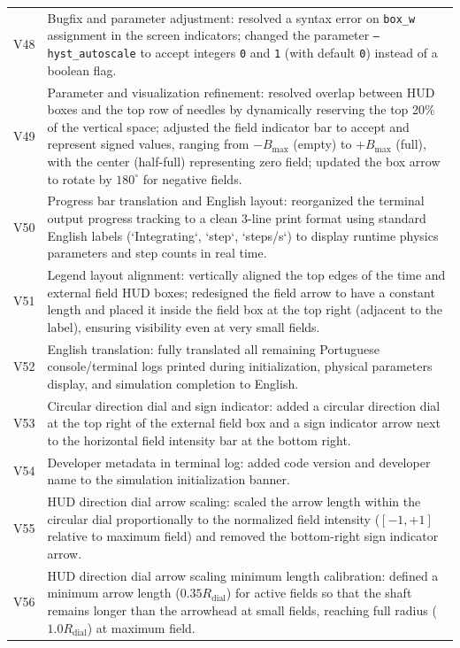 \documentclass[11pt,a4paper]{article}
\newcommand{\code}[1]{\texttt{#1}}
\begin{document}
\begin{longtable}{@{}lp{11.5cm}@{}}
V48 & Bugfix and parameter adjustment: resolved a syntax error on \code{box\_w} assignment in the screen indicators; changed the parameter \code{--hyst\_autoscale} to accept integers \code{0} and \code{1} (with default \code{0}) instead of a boolean flag. \\
V49 & Parameter and visualization refinement: resolved overlap between HUD boxes and the top row of needles by dynamically reserving the top 20\% of the vertical space; adjusted the field indicator bar to accept and represent signed values, ranging from $-B_{\max}$ (empty) to $+B_{\max}$ (full), with the center (half-full) representing zero field; updated the box arrow to rotate by $180^\circ$ for negative fields. \\
V50 & Progress bar translation and English layout: reorganized the terminal output progress tracking to a clean 3-line print format using standard English labels (`Integrating`, `step`, `steps/s`) to display runtime physics parameters and step counts in real time. \\
V51 & Legend layout alignment: vertically aligned the top edges of the time and external field HUD boxes; redesigned the field arrow to have a constant length and placed it inside the field box at the top right (adjacent to the label), ensuring visibility even at very small fields. \\
V52 & English translation: fully translated all remaining Portuguese console/terminal logs printed during initialization, physical parameters display, and simulation completion to English. \\
V53 & Circular direction dial and sign indicator: added a circular direction dial at the top right of the external field box and a sign indicator arrow next to the horizontal field intensity bar at the bottom right. \\
V54 & Developer metadata in terminal log: added code version and developer name to the simulation initialization banner. \\
V55 & HUD direction dial arrow scaling: scaled the arrow length within the circular dial proportionally to the normalized field intensity ($[-1, +1]$ relative to maximum field) and removed the bottom-right sign indicator arrow. \\
V56 & HUD direction dial arrow scaling minimum length calibration: defined a minimum arrow length ($0.35 R_{\mathrm{dial}}$) for active fields so that the shaft remains longer than the arrowhead at small fields, reaching full radius ($1.0 R_{\mathrm{dial}}$) at maximum field. \\

\end{longtable}
\end{document}
